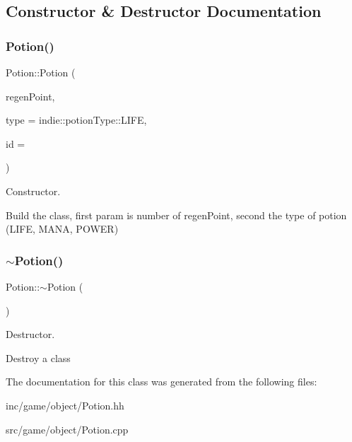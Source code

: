 \subsection{Constructor \& Destructor Documentation}
\mbox{\label{classPotion_a2fae017a2dbe6fd82269d19a51908959}} 
\subsubsection{\texorpdfstring{Potion()}{Potion()}}
{\footnotesize\ttfamily Potion\+::\+Potion (\begin{DoxyParamCaption}\item[{\hyperlink{namespaceirr_ac66849b7a6ed16e30ebede579f9b47c6}{irr\+::s32}}]{regen\+Point,  }\item[{indie\+::potion\+Type}]{type = {\ttfamily indie\+:\+:potionType\+:\+:LIFE},  }\item[{\hyperlink{namespaceirr_a0416a53257075833e7002efd0a18e804}{irr\+::u32}}]{id = {} }\end{DoxyParamCaption})}



Constructor. 

Build the class, first param is number of regen\+Point, second the type of potion (L\+I\+FE, M\+A\+NA, P\+O\+W\+ER) \mbox{\label{classPotion_a8730c8052ec698171885bb5dacda9cca}} 
\subsubsection{\texorpdfstring{$\sim$\+Potion()}{~Potion()}}
{\footnotesize\ttfamily Potion\+::$\sim$\+Potion (\begin{DoxyParamCaption}{ }\end{DoxyParamCaption})}



Destructor. 

Destroy a class 

The documentation for this class was generated from the following files\+:\begin{DoxyCompactItemize}
\item 
inc/game/object/Potion.\+hh\item 
src/game/object/Potion.\+cpp\end{DoxyCompactItemize}
